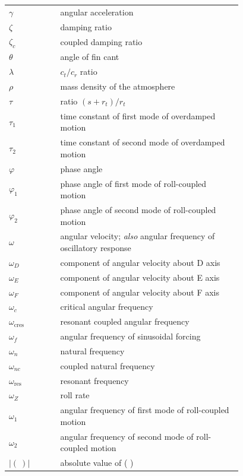 \begin{longtable}{@{}l p{0.78\linewidth}@{}}
$\gamma$ & angular acceleration \\
$\zeta$ & damping ratio \\
$\zeta_c$ & coupled damping ratio \\
$\theta$ & angle of fin cant \\
$\lambda$ & $c_t/c_r$ ratio \\
$\rho$ & mass density of the atmosphere \\
$\tau$ & ratio $(s + r_t)/r_t$ \\
$\tau_1$ & time constant of first mode of overdamped motion \\
$\tau_2$ & time constant of second mode of overdamped motion \\
$\varphi$ & phase angle \\
$\varphi_1$ & phase angle of first mode of roll-coupled motion \\
$\varphi_2$ & phase angle of second mode of roll-coupled motion \\
$\omega$ & angular velocity; \emph{also} angular frequency of oscillatory response \\
$\omega_D$ & component of angular velocity about D axis \\
$\omega_E$ & component of angular velocity about E axis \\
$\omega_F$ & component of angular velocity about F axis \\
$\omega_c$ & critical angular frequency \\
$\omega_{\mathrm{cres}}$ & resonant coupled angular frequency \\
$\omega_f$ & angular frequency of sinusoidal forcing \\
$\omega_n$ & natural frequency \\
$\omega_{nc}$ & coupled natural frequency \\
$\omega_{\mathrm{res}}$ & resonant frequency \\
$\omega_Z$ & roll rate \\
$\omega_1$ & angular frequency of first mode of roll-coupled motion \\
$\omega_2$ & angular frequency of second mode of roll-coupled motion \\
$|(\ )|$ & absolute value of ( ) \\
\end{longtable}
\addtocounter{table}{-1}%
